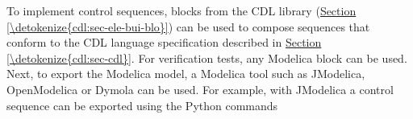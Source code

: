 \documentclass[letterpaper,10pt, openany,english]{sphinxmanual}
\begin{document}
To implement control sequences, blocks from the
CDL library (\hyperref[\detokenize{cdl:sec-ele-bui-blo}]{Section \ref{\detokenize{cdl:sec-ele-bui-blo}}}) can be used to compose sequences that conform
to the CDL language specification described in \hyperref[\detokenize{cdl:sec-cdl}]{Section \ref{\detokenize{cdl:sec-cdl}}}.
For verification tests, any Modelica block can be used.
Next, to export the Modelica model, a Modelica tool such as JModelica, OpenModelica
or Dymola can be used.
For example, with JModelica a control sequence can be exported using the Python commands

\begin{sphinxVerbatim}[commandchars=\\\{\}]
   
\end{sphinxVerbatim}
\end{document}
